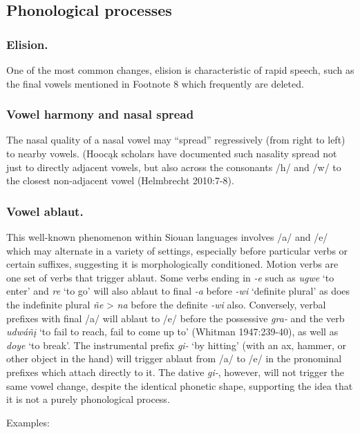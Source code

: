 \documentclass[output=paper]{LSP/langsci}
\begin{document}
\subsection{Phonological processes} 
\subsubsection{Elision.}  One of the most common changes, elision is characteristic of rapid speech, such as the final vowels mentioned in Footnote 8 which frequently are deleted.  			

\subsubsection{Vowel harmony and nasal spread}  The nasal quality of a nasal vowel may ``spread'' regressively (from right to left) to nearby vowels.  (Hooc\k{a}k scholars have documented such nasality spread not just to directly adjacent vowels, but also across the consonants /h/ and /w/ to the closest non-adjacent vowel  (Helmbrecht 2010:7-8).  

\subsubsection{Vowel ablaut.}  This well-known phenomenon within Siouan languages involves /a/ and /e/ which may alternate in a variety of settings, especially before particular verbs or certain suffixes, suggesting it is morphologically conditioned.  Motion verbs are one set of verbs that trigger ablaut.  Some verbs ending in \textit{-e} such as \textit{ugwe} `to enter' and \textit{re} `to go' will also ablaut to final \textit{-a}  before \textit{-wi} `definite plural' as does the indefinite plural \textit{\~ne} > \textit{na} before the definite \textit{-wi} also.  Conversely, verbal prefixes with final /a/ will ablaut to /e/ before the possessive \textit{gra-} and the verb \textit{udw\'a\~n\k{i}} `to fail to reach, fail to come up to' (Whitman 1947:239-40), as well as \textit{doye} `to break'.  The instrumental prefix \textit{gi-} `by hitting' (with an ax, hammer, or other object in the hand) will trigger ablaut from /a/ to /e/ in the pronominal prefixes which attach directly to it.  The dative \textit{gi-}, however, will not trigger the same vowel change, despite the identical phonetic shape, supporting the idea that it is not a purely phonological process.  

Examples:
\end{document}
